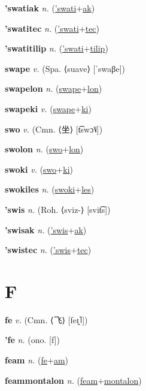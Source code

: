 \textbf{\hypertarget{'swatiak}{'swatiak}} \textit{n.} (\hyperlink{'swati}{'swati}+\allowbreak \hyperlink{ak}{ak})


\textbf{\hypertarget{'swatitec}{'swatitec}} \textit{n.} (\hyperlink{'swati}{'swati}+\allowbreak \hyperlink{tec}{tec})


\textbf{\hypertarget{'swatitilip}{'swatitilip}} \textit{n.} (\hyperlink{'swati}{'swati}+\allowbreak \hyperlink{tilip}{tilip})


\textbf{\hypertarget{swape}{swape}} \textit{v.} (Spa. ⟨suave⟩ [ˈswaβe])


\textbf{\hypertarget{swapelon}{swapelon}} \textit{n.} (\hyperlink{swape}{swape}+\allowbreak \hyperlink{lon}{lon})


\textbf{\hypertarget{swapeki}{swapeki}} \textit{v.} (\hyperlink{swape}{swape}+\allowbreak \hyperlink{ki}{ki})


\textbf{\hypertarget{swo}{swo}} \textit{v.} (Cmn. ⟨{\chinese{}坐}⟩ [t͡swɔ˥˩])


\textbf{\hypertarget{swolon}{swolon}} \textit{n.} (\hyperlink{swo}{swo}+\allowbreak \hyperlink{lon}{lon})


\textbf{\hypertarget{swoki}{swoki}} \textit{v.} (\hyperlink{swo}{swo}+\allowbreak \hyperlink{ki}{ki})


\textbf{\hypertarget{swokiles}{swokiles}} \textit{n.} (\hyperlink{swoki}{swoki}+\allowbreak \hyperlink{les}{les})


\textbf{\hypertarget{'swis}{'swis}} \textit{n.} (Roh. ⟨sviz-⟩ [svit͡s])


\textbf{\hypertarget{'swisak}{'swisak}} \textit{n.} (\hyperlink{'swis}{'swis}+\allowbreak \hyperlink{ak}{ak})


\textbf{\hypertarget{'swistec}{'swistec}} \textit{n.} (\hyperlink{'swis}{'swis}+\allowbreak \hyperlink{tec}{tec})


\section{F}

\textbf{\hypertarget{fe}{fe}} \textit{v.} (Cmn. ⟨{\chinese{}飞}⟩ [feɪ̯˥])


\textbf{\hypertarget{'fe}{'fe}} \textit{n.} (ono. [f])


\textbf{\hypertarget{feam}{feam}} \textit{n.} (\hyperlink{fe}{fe}+\allowbreak \hyperlink{am}{am})


\textbf{\hypertarget{feammontalon}{feammontalon}} \textit{n.} (\hyperlink{feam}{feam}+\allowbreak \hyperlink{montalon}{montalon})


